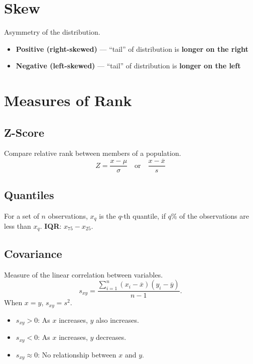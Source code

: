 \documentclass{article}
\begin{document}
\begin{multicols}{3}
    \section{Skew}
    Asymmetry of the distribution.
    \begin{itemize}
        \item \textbf{Positive (right-skewed)} --- ``tail'' of distribution is \textbf{longer on the right}
        \item \textbf{Negative (left-skewed)} --- ``tail'' of distribution is \textbf{longer on the left}
    \end{itemize}
    \section{Measures of Rank}
    \subsection{Z-Score}
    Compare relative rank between members of a population.
    \begin{equation*}
        Z = \frac{x  - \mu}{\sigma} \quad \text{or} \quad \frac{x - \overline{x}}{s}
    \end{equation*}
    \subsection{Quantiles}
    For a set of \(n\) observations, \(x_q\) is the \(q\)-th quantile, if \(q\)\% of the observations are less than \(x_q\).
    \textbf{IQR}: \(x_{75} - x_{25}\).
    \subsection{Covariance}
    Measure of the linear correlation between variables.
    \begin{equation*}
        s_{xy} = \frac{\sum_{i = 1}^n \left( x_i - \overline{x} \right) \left( y_i - \overline{y} \right)}{n - 1}.
    \end{equation*}
    When \(x = y\), \(s_{xy} = s^2\).
    \begin{itemize}
        \item \(s_{xy} > 0\): As \(x\) increases, \(y\) also increases.
        \item \(s_{xy} < 0\): As \(x\) increases, \(y\) decreases.
        \item \(s_{xy} \approx 0\): No relationship between \(x\) and \(y\).
    \end{itemize}

\end{multicols}
\end{document}
